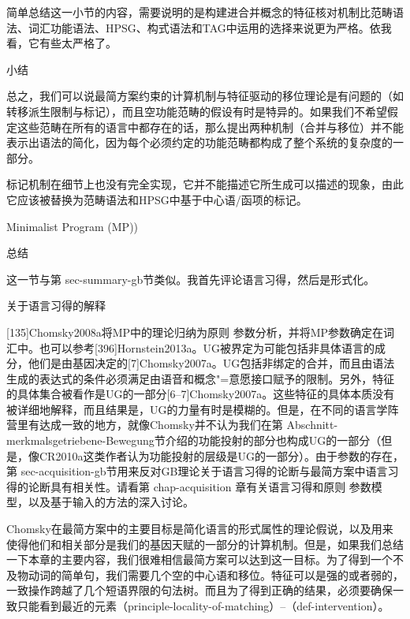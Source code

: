 简单总结这一小节的内容，需要说明的是构建进合并概念的特征核对机制比范畴语法、词汇功能语法、HPSG、构式语法和TAG中运用的选择来说更为严格。依我看，它有些太严格了。




小结


总之，我们可以说最简方案约束的计算机制与特征驱动的移位理论是有问题的（如转移派生限制与标记），而且空功能范畴的假设有时是特异的。如果我们不希望假定这些范畴在所有的语言中都存在的话，那么提出两种机制（合并与移位）并不能表示出语法的简化，因为每个必须约定的功能范畴都构成了整个系统的复杂度的一部分。







标记机制在细节上也没有完全实现，它并不能描述它所生成可以描述的现象，由此它应该被替换为范畴语法和HPSG中基于中心语/函项的标记。



Minimalist Program (MP))

总结


这一节与第 sec-summary-gb节类似。我首先评论语言习得，然后是形式化。



关于语言习得的解释


[135]Chomsky2008a将MP中的理论归纳为原则  参数分析，并将MP参数确定在词汇中。也可以参考[396]Hornstein2013a。UG被界定为可能包括非具体语言的成分，他们是由基因决定的[7]Chomsky2007a。UG包括非绑定的合并，而且由语法生成的表达式的条件必须满足由语音和概念"=意愿接口赋予的限制。另外，特征的具体集合被看作是UG的一部分[6--7]Chomsky2007a。这些特征的具体本质没有被详细地解释，而且结果是，UG的力量有时是模糊的。但是，在不同的语言学阵营里有达成一致的地方，就像Chomsky并不认为我们在第 Abschnitt-merkmalsgetriebene-Bewegung节介绍的功能投射的部分也构成UG的一部分（但是，像CR2010a这类作者认为功能投射的层级是UG的一部分）。由于参数的存在，第 sec-acquisition-gb节用来反对GB理论关于语言习得的论断与最简方案中语言习得的论断具有相关性。请看第 chap-acquisition 章有关语言习得和原则  参数模型，以及基于输入的方法的深入讨论。





















Chomsky在最简方案中的主要目标是简化语言的形式属性的理论假说，以及用来使得他们和相关部分是我们的基因天赋的一部分的计算机制。但是，如果我们总结一下本章的主要内容，我们很难相信最简方案可以达到这一目标。为了得到一个不及物动词的简单句，我们需要几个空的中心语和移位。特征可以是强的或者弱的，一致操作跨越了几个短语界限的句法树。而且为了得到正确的结果，必须要确保一致只能看到最近的元素（principle-locality-of-matching）--（def-intervention）。












